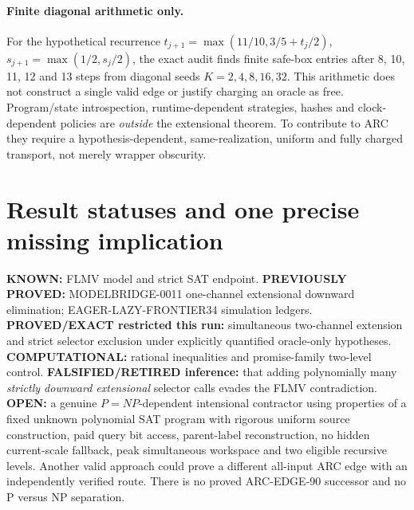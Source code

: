 \documentclass[11pt]{article}
\begin{document}
\paragraph{Finite diagonal arithmetic only.}
For the hypothetical recurrence $t_{j+1}=\max(11/10,3/5+t_j/2)$, $s_{j+1}=\max(1/2,s_j/2)$, the exact audit finds finite safe-box entries after 8, 10, 11, 12 and 13 steps from diagonal seeds $K=2,4,8,16,32$. This arithmetic does not construct a single valid edge or justify charging an oracle as free. Program/state introspection, runtime-dependent strategies, hashes and clock-dependent policies are \emph{outside} the extensional theorem. To contribute to ARC they require a hypothesis-dependent, same-realization, uniform and fully charged transport, not merely wrapper obscurity.
\section{Result statuses and one precise missing implication}
\textbf{KNOWN:} FLMV model and strict SAT endpoint. \textbf{PREVIOUSLY PROVED:} MODELBRIDGE-0011 one-channel extensional downward elimination; EAGER-LAZY-FRONTIER34 simulation ledgers. \textbf{PROVED/EXACT restricted this run:} simultaneous two-channel extension and strict selector exclusion under explicitly quantified oracle-only hypotheses. \textbf{COMPUTATIONAL:} rational inequalities and promise-family two-level control. \textbf{FALSIFIED/RETIRED inference:} that adding polynomially many \emph{strictly downward extensional} selector calls evades the FLMV contradiction. \textbf{OPEN:} a genuine $P=NP$-dependent intensional contractor using properties of a fixed unknown polynomial SAT program with rigorous uniform source construction, paid query bit access, parent-label reconstruction, no hidden current-scale fallback, peak simultaneous workspace and two eligible recursive levels. Another valid approach could prove a different all-input ARC edge with an independently verified route. There is no proved ARC-EDGE-90 successor and no P versus NP separation.
\end{document}
